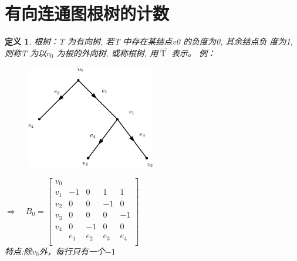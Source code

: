\documentclass[11pt,a4paper,openany]{book}
\newcommand{\hwxw}{\CJKfamily{hwxw}}
\newtheorem{defination}{\textbf{定义}}[section]
\begin{document}
\section{有向连通图根树的计数}
\begin{defination}
根树：T 为有向树, 若T 中存在某结点v0 的负度为0, 其余结点负
度为1, 则称T 为以$v_0$ 为根的外向树, 或称根树, 用$\mathop{T}\limits^{\rightharpoonup}$ 表示。
例：
\begin{figure}[H]
  \centering
  \includegraphics[width=0.5\textwidth]{3_6.eps}\\
  \caption*{}
\end{figure}
$\Rightarrow \quad B_0=\left[
                         \begin{array}{ccccc}
                           v_0 &  &  &  &  \\
                           v_1& -1 & 0 & 1 & 1\\
                           v_2 & 0 & 0 & -1 & 0 \\
                           v_3 & 0 & 0 & 0& -1 \\
                           v_4 & 0 & -1 & 0 & 0 \\
                          & e_1  & e_2 & e_3 & e_4 \\
                         \end{array}
                       \right]
$\\
{\hwxw 特点:除$v_0$外，每行只有一个$-1$}\\

\end{defination}
\end{document}
